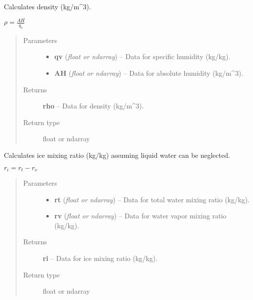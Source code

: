 \documentclass[letterpaper,10pt,english]{sphinxmanual}
\begin{document}

\begin{fulllineitems}
\label{atmos:atmos.equations.rho_from_qv_AH}
Calculates density (kg/m\textasciicircum{}3).

\(\rho = \frac{AH}{q_v}\)
\begin{quote}\begin{description}
\item[{Parameters}] \leavevmode\begin{itemize}
\item {} 
\textbf{qv} (\emph{float or ndarray}) -- Data for specific humidity (kg/kg).

\item {} 
\textbf{AH} (\emph{float or ndarray}) -- Data for absolute humidity (kg/m\textasciicircum{}3).

\end{itemize}

\item[{Returns}] \leavevmode
\textbf{rho} --
Data for density (kg/m\textasciicircum{}3).

\item[{Return type}] \leavevmode
float or ndarray

\end{description}\end{quote}

\end{fulllineitems}


\begin{fulllineitems}
\label{atmos:atmos.equations.ri_from_rt_rv}
Calculates ice mixing ratio (kg/kg) assuming liquid water can be neglected.

\(r_i = r_t-r_v\)
\begin{quote}\begin{description}
\item[{Parameters}] \leavevmode\begin{itemize}
\item {} 
\textbf{rt} (\emph{float or ndarray}) -- Data for total water mixing ratio (kg/kg).

\item {} 
\textbf{rv} (\emph{float or ndarray}) -- Data for water vapor mixing ratio (kg/kg).

\end{itemize}

\item[{Returns}] \leavevmode
\textbf{ri} --
Data for ice mixing ratio (kg/kg).

\item[{Return type}] \leavevmode
float or ndarray

\end{description}\end{quote}

\end{fulllineitems}
\end{document}
